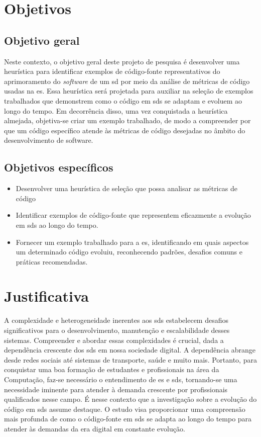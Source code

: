 \section{Objetivos}\label{sec:objetivos}
\subsection{Objetivo geral}\label{subsec:objetivoGeral}
 Neste contexto, o objetivo geral deste projeto de pesquisa é desenvolver uma heurística para identificar exemplos de código-fonte representativos do aprimoramento do \textit{software} de um \gls{sd} por meio da análise de métricas de código usadas na \gls{es}. Essa heurística será projetada para auxiliar na seleção de exemplos trabalhados que demonstrem como o código em \gls{sds} se adaptam e evoluem ao longo do tempo. Em decorrência disso, uma vez conquistada a heurística almejada, objetiva-se criar um exemplo trabalhado, de modo a compreender por que um código específico atende às métricas de código desejadas no âmbito do desenvolvimento de software.

\subsection{Objetivos específicos}\label{subsec:objetivosEspecificos}
\begin{itemize}
    \item Desenvolver uma heurística de seleção que possa analisar as métricas de código
    \item Identificar exemplos de código-fonte que representem eficazmente a evolução em \gls{sds} ao longo do tempo.
    \item Fornecer um exemplo trabalhado para a \gls{es}, identificando em quais aspectos um determinado código evoluiu, reconhecendo padrões, desafios comuns e práticas recomendadas.
\end{itemize}

\section{Justificativa}\label{sec:justificativa}
A complexidade e heterogeneidade inerentes aos \gls{sds} estabelecem desafios significativos para o desenvolvimento, manutenção e escalabilidade desses sistemas. Compreender e abordar essas complexidades é crucial, dada a dependência crescente dos \gls{sds} em nossa sociedade digital. A dependência abrange desde redes sociais até sistemas de transporte, saúde e muito mais. Portanto, para conquistar uma boa formação de estudantes e profissionais na área da Computação, faz-se necessário o entendimento de \gls{es} e \gls{sds}, tornando-se uma necessidade iminente para atender à demanda crescente por profissionais qualificados nesse campo.
É nesse contexto que a investigação sobre a evolução do código em \gls{sds} assume destaque. O estudo visa proporcionar uma compreensão mais profunda de como o código-fonte em \gls{sds} se adapta ao longo do tempo para atender às demandas da era digital em constante evolução.

